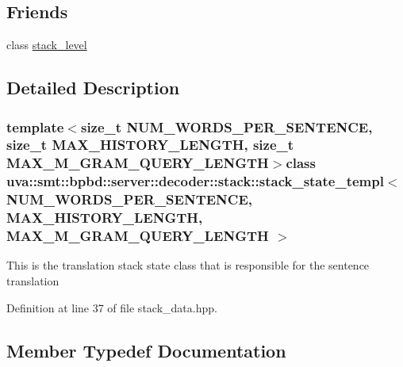 \subsection*{Friends}
\begin{DoxyCompactItemize}
\item 
class \hyperlink{classuva_1_1smt_1_1bpbd_1_1server_1_1decoder_1_1stack_1_1stack__state__templ_a136ccb532f42529ee8ceb4180b313f85}{stack\+\_\+level}
\end{DoxyCompactItemize}


\subsection{Detailed Description}
\subsubsection*{template$<$size\+\_\+t N\+U\+M\+\_\+\+W\+O\+R\+D\+S\+\_\+\+P\+E\+R\+\_\+\+S\+E\+N\+T\+E\+N\+C\+E, size\+\_\+t M\+A\+X\+\_\+\+H\+I\+S\+T\+O\+R\+Y\+\_\+\+L\+E\+N\+G\+T\+H, size\+\_\+t M\+A\+X\+\_\+\+M\+\_\+\+G\+R\+A\+M\+\_\+\+Q\+U\+E\+R\+Y\+\_\+\+L\+E\+N\+G\+T\+H$>$class uva\+::smt\+::bpbd\+::server\+::decoder\+::stack\+::stack\+\_\+state\+\_\+templ$<$ N\+U\+M\+\_\+\+W\+O\+R\+D\+S\+\_\+\+P\+E\+R\+\_\+\+S\+E\+N\+T\+E\+N\+C\+E, M\+A\+X\+\_\+\+H\+I\+S\+T\+O\+R\+Y\+\_\+\+L\+E\+N\+G\+T\+H, M\+A\+X\+\_\+\+M\+\_\+\+G\+R\+A\+M\+\_\+\+Q\+U\+E\+R\+Y\+\_\+\+L\+E\+N\+G\+T\+H $>$}

This is the translation stack state class that is responsible for the sentence translation 

Definition at line 37 of file stack\+\_\+data.\+hpp.



\subsection{Member Typedef Documentation}
\hypertarget{classuva_1_1smt_1_1bpbd_1_1server_1_1decoder_1_1stack_1_1stack__state__templ_a94773592dfe5327c6cc5b76b47c571df}{}
